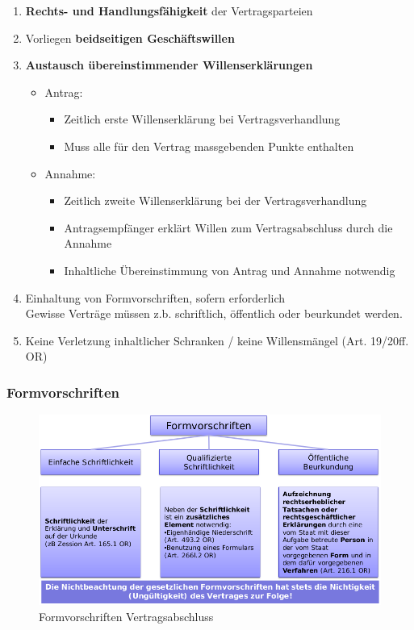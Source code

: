\begin{enumerate}
	\tightlist
	\item \textbf{Rechts- und Handlungsfähigkeit} der Vertragsparteien
	\item Vorliegen \textbf{beidseitigen Geschäftswillen}
	\item \textbf{Austausch übereinstimmender Willenserklärungen}
	\begin{itemize}
		\tightlist
		\item Antrag:
		\begin{itemize}
			\tightlist
			\item Zeitlich erste Willenserklärung bei Vertragsverhandlung
			\item Muss alle für den Vertrag massgebenden Punkte enthalten
		\end{itemize}
		\item Annahme:
		\begin{itemize}
			\tightlist
			\item Zeitlich zweite Willenserklärung bei der Vertragsverhandlung
			\item Antragsempfänger erklärt Willen zum Vertragsabschluss durch die
			Annahme
			\item Inhaltliche Übereinstimmung von Antrag und Annahme notwendig
		\end{itemize}
	\end{itemize}
	\item Einhaltung von Formvorschriften, sofern erforderlich\\
	Gewisse Verträge müssen z.b. schriftlich, öffentlich oder beurkundet
	werden.
	\item Keine Verletzung inhaltlicher Schranken / keine Willensmängel (Art.
	19/20ff. OR)
\end{enumerate}


\subsubsection{Formvorschriften}

\begin{figure}[H]
\centering
\includegraphics[width=.9\textwidth]{figures/formvorschriftenVertragsabschluss.png}
\caption{Formvorschriften Vertragsabschluss}
\end{figure}

